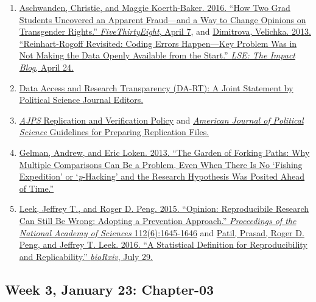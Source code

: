 \documentclass[]{article}
\providecommand{\tightlist}{%
  \setlength{\itemsep}{0pt}\setlength{\parskip}{0pt}}
\begin{document}
\begin{enumerate}
\def\labelenumi{\arabic{enumi}.}
\tightlist
\item
  \href{http://fivethirtyeight.com/features/how-two-grad-students-uncovered-michael-lacour-fraud-and-a-way-to-change-opinions-on-transgender-rights/}{Aschwanden,
  Christie, and Maggie Koerth-Baker. 2016. ``How Two Grad Students
  Uncovered an Apparent Fraud---and a Way to Change Opinions on
  Transgender Rights.'' \emph{FiveThirtyEight}, April 7}, and
  \href{http://blogs.lse.ac.uk/impactofsocialsciences/2013/04/24/reinhart-rogoff-revisited-why-we-need-open-data-in-economics/}{Dimitrova,
  Velichka. 2013. ``Reinhart-Rogoff Revisited: Coding Errors
  Happen---Key Problem Was in Not Making the Data Openly Available from
  the Start.'' \emph{LSE: The Impact Blog}, April 24.}
\item
  \href{http://journals.cambridge.org/action/displayAbstract?fromPage=online\&aid=9911378\&fulltextType=LT\&fileId=S2049847015000448}{Data
  Access and Research Transparency (DA-RT): A Joint Statement by
  Political Science Journal Editors.}
\item
  \href{https://ajps.org/ajps-replication-policy/}{\emph{AJPS}
  Replication and Verification Policy} and
  \href{https://ajpsblogging.files.wordpress.com/2015/03/ajps-guide-for-replic-materials-1-0.pdf}{\emph{American
  Journal of Political Science} Guidelines for Preparing Replication
  Files.}
\item
  \href{http://www.stat.columbia.edu/~gelman/research/unpublished/p_hacking.pdf}{Gelman,
  Andrew, and Eric Loken. 2013. ``The Garden of Forking Paths: Why
  Multiple Comparisons Can Be a Problem, Even When There Is No `Fishing
  Expedition' or `\emph{p}-Hacking' and the Research Hypothesis Was
  Posited Ahead of Time.''}
\item
  \href{http://www.pnas.org.proxy.lib.uiowa.edu/content/112/6/1645}{Leek,
  Jeffrey T., and Roger D. Peng. 2015. ``Opinion: Reproducibile Research
  Can Still Be Wrong: Adopting a Prevention Approach.''
  \emph{Proceedings of the National Academy of Sciences}
  112(6):1645-1646} and
  \href{http://biorxiv.org/content/biorxiv/early/2016/07/29/066803.full.pdf}{Patil,
  Prasad, Roger D. Peng, and Jeffrey T. Leek. 2016. ``A Statistical
  Definition for Reproducibility and Replicability.'' \emph{bioRxiv},
  July 29.}
\end{enumerate}

\hypertarget{week-3-january-23-chapter-03}{%
\subsection{Week 3, January 23:
Chapter-03}\label{week-3-january-23-chapter-03}}
\end{document}
